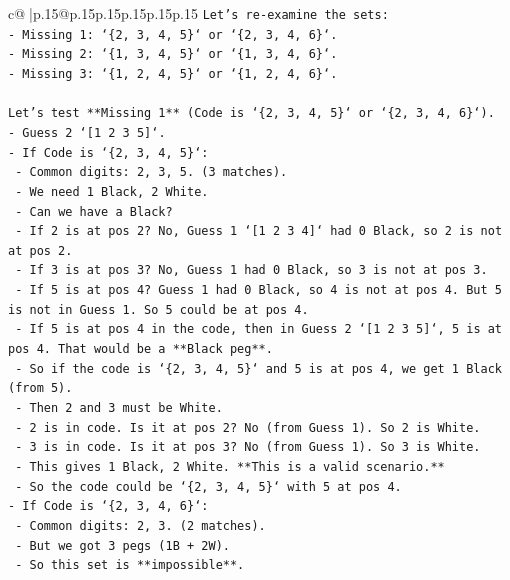 \documentclass{article}
\begin{document}
{\begin{supertabular}{c@{$\;$}|p{.15\linewidth}@{}p{.15\linewidth}p{.15\linewidth}p{.15\linewidth}p{.15\linewidth}p{.15\linewidth}}
{{{\texttt{Let's re{-}examine the sets:} \\
\texttt{{-} Missing 1: `\{2, 3, 4, 5\}` or `\{2, 3, 4, 6\}`.} \\
\texttt{{-} Missing 2: `\{1, 3, 4, 5\}` or `\{1, 3, 4, 6\}`.} \\
\texttt{{-} Missing 3: `\{1, 2, 4, 5\}` or `\{1, 2, 4, 6\}`.} \\
\\ 
\texttt{Let's test **Missing 1** (Code is `\{2, 3, 4, 5\}` or `\{2, 3, 4, 6\}`).} \\
\texttt{{-} Guess 2 `{[}1 2 3 5{]}`.} \\
\texttt{{-} If Code is `\{2, 3, 4, 5\}`:} \\
\texttt{  {-} Common digits: 2, 3, 5. (3 matches).} \\
\texttt{  {-} We need 1 Black, 2 White.} \\
\texttt{  {-} Can we have a Black?} \\
\texttt{    {-} If 2 is at pos 2? No, Guess 1 `{[}1 2 3 4{]}` had 0 Black, so 2 is not at pos 2.} \\
\texttt{    {-} If 3 is at pos 3? No, Guess 1 had 0 Black, so 3 is not at pos 3.} \\
\texttt{    {-} If 5 is at pos 4? Guess 1 had 0 Black, so 4 is not at pos 4. But 5 is not in Guess 1. So 5 could be at pos 4.} \\
\texttt{    {-} If 5 is at pos 4 in the code, then in Guess 2 `{[}1 2 3 5{]}`, 5 is at pos 4. That would be a **Black peg**.} \\
\texttt{    {-} So if the code is `\{2, 3, 4, 5\}` and 5 is at pos 4, we get 1 Black (from 5).} \\
\texttt{    {-} Then 2 and 3 must be White.} \\
\texttt{      {-} 2 is in code. Is it at pos 2? No (from Guess 1). So 2 is White.} \\
\texttt{      {-} 3 is in code. Is it at pos 3? No (from Guess 1). So 3 is White.} \\
\texttt{    {-} This gives 1 Black, 2 White. **This is a valid scenario.**} \\
\texttt{    {-} So the code could be `\{2, 3, 4, 5\}` with 5 at pos 4.} \\
\texttt{{-} If Code is `\{2, 3, 4, 6\}`:} \\
\texttt{  {-} Common digits: 2, 3. (2 matches).} \\
\texttt{  {-} But we got 3 pegs (1B + 2W).} \\
\texttt{  {-} So this set is **impossible**.} \\
}}}
\end{supertabular}}
\end{document}

